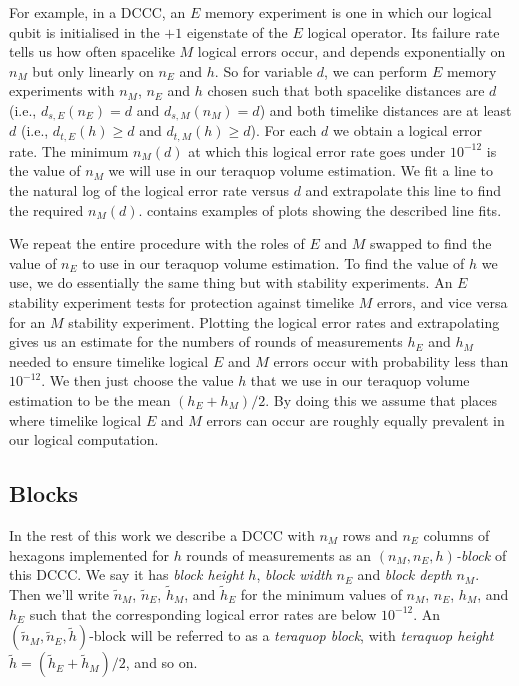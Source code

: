 For example, in a DCCC, an $E$ memory experiment is one in which our logical qubit is initialised in the $+1$ eigenstate of the $E$ logical operator.
Its failure rate tells us how often spacelike $M$ logical errors occur,
and depends exponentially on $n_M$ but only linearly on $n_E$ and $h$.
So for variable $d$, we can perform $E$ memory experiments with $n_M$, $n_E$ and $h$ chosen such that both spacelike distances are $d$ (i.e., $d_{s,E}(n_E) = d$ and $d_{s,M}(n_M) = d$) and both timelike distances are at least $d$ (i.e., $d_{t,E}(h) \geq d$ and $d_{t,M}(h) \geq d$).
For each $d$ we obtain a logical error rate.
The minimum $n_M(d)$ at which this logical error rate goes under $10^{-12}$ is the value of $n_M$ we will use in our teraquop volume estimation.
We fit a line to the natural log of the logical error rate versus $d$ and extrapolate this line to find the required $n_M(d)$.
 contains examples of plots showing the described line fits.

We repeat the entire procedure with the roles of $E$ and $M$ swapped to find the value of $n_E$ to use in our teraquop volume estimation.
To find the value of $h$ we use, we do essentially the same thing but with stability experiments.
An $E$ stability experiment tests for protection against timelike $M$ errors, and vice versa for an $M$ stability experiment.
Plotting the logical error rates and extrapolating gives us an estimate for the numbers of rounds of measurements $h_E$ and $h_M$ needed to ensure timelike logical $E$ and $M$ errors occur with probability less than $10^{-12}$.
We then just choose the value $h$ that we use in our teraquop volume estimation to be the mean $(h_E + h_M)/2$.
By doing this we assume that places where timelike logical $E$ and $M$ errors can occur are roughly equally prevalent in our logical computation.

\subsection{Blocks}\label{teraquop-blocks}

In the rest of this work we describe a DCCC with $n_M$ rows and $n_E$ columns of hexagons implemented for $h$ rounds of measurements as an \textit{$(n_M, n_E, h)$-block} of this DCCC.
We say it has \textit{block height} $h$, \textit{block width} $n_E$ and \textit{block depth} $n_M$.
Then we'll write $\tilde{n}_M$, $\tilde{n}_E$, $\tilde{h}_M$, and $\tilde{h}_E$ for the minimum values of $n_M$, $n_E$, $h_M$, and $h_E$ such that the corresponding logical error rates are below $10^{-12}$.
An $(\tilde{n}_M, \tilde{n}_E, \tilde{h})$-block will be referred to as a \textit{teraquop block},
with \textit{teraquop height} $\tilde{h} = (\tilde{h}_E + \tilde{h}_M)/2$, and so on.

